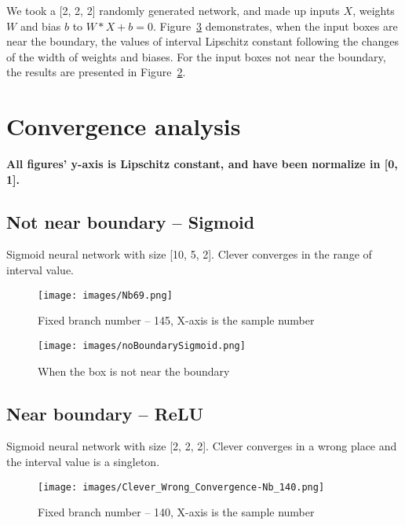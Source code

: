 \documentclass[11pt]{article}
\begin{document}
We took a [2, 2, 2] randomly generated network, and made up inputs $X$, weights $W$ and bias $b$ to $W*X + b = 0$. Figure~\ref{fig:nearBoundary} demonstrates, when the input boxes are near the boundary, the values of interval Lipschitz constant following the changes of the width of weights and biases. For the input boxes not near the boundary, the results are presented in Figure~\ref{fig:notBoundary}.




\section{Convergence analysis}
\textbf{All figures' y-axis is Lipschitz constant, and have been normalize in [0, 1].}
\subsection{Not near boundary -- Sigmoid}
Sigmoid neural network with size [10, 5, 2].
Clever converges in the range of interval value.
\begin{figure}[H]
    \centering
    \texttt{[image: images/Nb69.png]}
    \caption{Fixed branch number -- 145, X-axis is the sample number}
    \label{fig:nearBoundary}
\end{figure}
\begin{figure}[H]
    \centering
    \texttt{[image: images/noBoundarySigmoid.png]}
    \caption{When the box is not near the boundary}
    \label{fig:notBoundary}
\end{figure}

\subsection{Near boundary -- ReLU}
Sigmoid neural network with size [2, 2, 2].
Clever converges in a wrong place and the interval value is a singleton.
\begin{figure}[H]
    \centering
    \texttt{[image: images/Clever\_Wrong\_Convergence-Nb\_140.png]}
    \caption{Fixed branch number -- 140, X-axis is the sample number}
    \label{fig:nearBoundary}
\end{figure}


\end{document}
